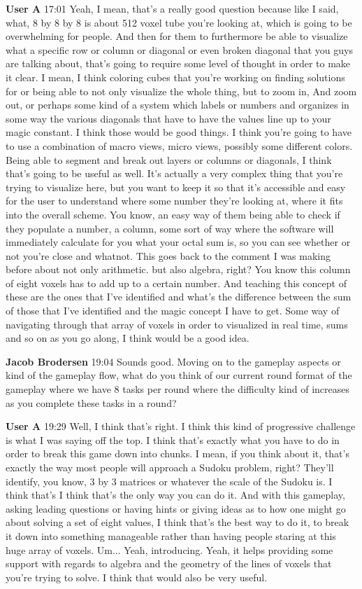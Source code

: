 \documentclass{article}
\begin{document}
\noindent \textbf{User A}   17:01
Yeah, I mean, that's a really good question because like I said, what, 8 by 8 by 8 is about 512 voxel tube you're looking at, which is going to be overwhelming for people. And then for them to furthermore be able to visualize what a specific
row or column or diagonal or even broken diagonal that you guys are talking about, that's going to require some level of thought in order to make it clear. I mean, I think coloring cubes that you're working on finding solutions for or being able to not only visualize the whole thing, but to zoom in,
And zoom out, or perhaps some kind of a system which labels or numbers and organizes in some way the various diagonals that have to have the values line up to your magic constant. I think those would be good things. I think you're going to have to use a combination of macro views, micro views, possibly some different colors.
Being able to segment and break out layers or columns or diagonals, I think that's going to be useful as well. It's actually a very complex thing that you're trying to visualize here, but you want to keep it so that it's accessible and easy for the user to understand where some number they're looking at, where it fits into the overall scheme.
You know, an easy way of them being able to check if they populate a number, a column, some sort of way where the software will immediately calculate for you what your octal sum is, so you can see whether or not you're close and whatnot. This goes back to the comment I was making before about not only arithmetic.
but also algebra, right? You know this column of eight voxels has to add up to a certain number. And teaching this concept of these are the ones that I've identified and what's the difference between the sum of those that I've identified and the magic concept I have to get. Some way of navigating through that array of voxels in order to
visualized in real time, sums and so on as you go along, I think would be a good idea.

\noindent \textbf{Jacob Brodersen}   19:04
Sounds good.
Moving on to the gameplay aspects or kind of the gameplay flow, what do you think of our current round format of the gameplay where we have 8 tasks per round where the difficulty kind of increases as you complete these tasks in a round?

\noindent \textbf{User A}   19:29
Well, I think that's right. I think this kind of progressive challenge is what I was saying off the top. I think that's exactly what you have to do in order to break this game down into chunks. I mean, if you think about it, that's exactly the way most people will approach a Sudoku problem, right? They'll identify, you know, 3 by 3 matrices or whatever the scale of the Sudoku is. I think that's
I think that's the only way you can do it. And with this gameplay, asking leading questions or having hints or giving ideas as to how one might go about solving a set of eight values, I think that's the best way to do it, to break it down into something manageable rather than having people staring at this huge array of voxels.
Um...
Yeah, introducing.
Yeah, it helps providing some support with regards to algebra and the geometry of the lines of voxels that you're trying to solve. I think that would also be very useful.
\end{document}
